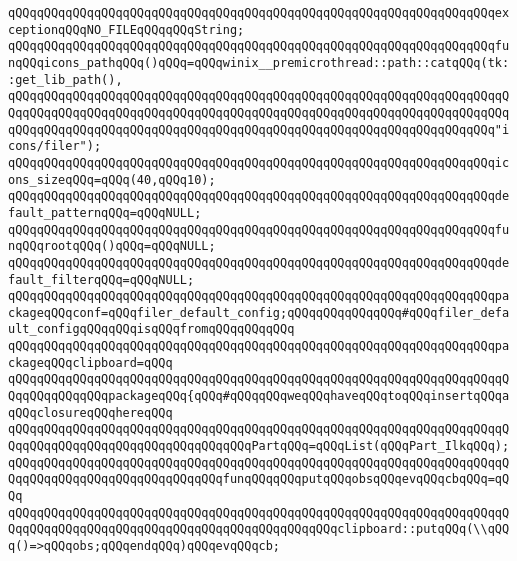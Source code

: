 \verb|qQQqqQQqqQQqqQQqqQQqqQQqqQQqqQQqqQQqqQQqqQQqqQQqqQQqqQQqqQQqqQQqqQQqexceptionqQQqNO_FILEqQQqqQQqString;|\newline
\verb|qQQqqQQqqQQqqQQqqQQqqQQqqQQqqQQqqQQqqQQqqQQqqQQqqQQqqQQqqQQqqQQqqQQqfunqQQqicons_pathqQQq()qQQq=qQQqwinix__premicrothread::path::catqQQq(tk::get_lib_path(),|\newline
\verb|qQQqqQQqqQQqqQQqqQQqqQQqqQQqqQQqqQQqqQQqqQQqqQQqqQQqqQQqqQQqqQQqqQQqqQQqqQQqqQQqqQQqqQQqqQQqqQQqqQQqqQQqqQQqqQQqqQQqqQQqqQQqqQQqqQQqqQQqqQQqqQQqqQQqqQQqqQQqqQQqqQQqqQQqqQQqqQQqqQQqqQQqqQQqqQQqqQQqqQQqqQQqqQQq"icons/filer");|\newline
\verb|qQQqqQQqqQQqqQQqqQQqqQQqqQQqqQQqqQQqqQQqqQQqqQQqqQQqqQQqqQQqqQQqqQQqicons_sizeqQQq=qQQq(40,qQQq10);|\newline
\verb|qQQqqQQqqQQqqQQqqQQqqQQqqQQqqQQqqQQqqQQqqQQqqQQqqQQqqQQqqQQqqQQqqQQqdefault_patternqQQq=qQQqNULL;|\newline
\verb|qQQqqQQqqQQqqQQqqQQqqQQqqQQqqQQqqQQqqQQqqQQqqQQqqQQqqQQqqQQqqQQqqQQqfunqQQqrootqQQq()qQQq=qQQqNULL;|\newline
\verb|qQQqqQQqqQQqqQQqqQQqqQQqqQQqqQQqqQQqqQQqqQQqqQQqqQQqqQQqqQQqqQQqqQQqdefault_filterqQQq=qQQqNULL;|\newline
\newline
\verb|qQQqqQQqqQQqqQQqqQQqqQQqqQQqqQQqqQQqqQQqqQQqqQQqqQQqqQQqqQQqqQQqqQQqpackageqQQqconf=qQQqfiler_default_config;qQQqqQQqqQQqqQQq#qQQqfiler_default_configqQQqqQQqisqQQqfromqQQqqQQqqQQq|\newline
\newline
\verb|qQQqqQQqqQQqqQQqqQQqqQQqqQQqqQQqqQQqqQQqqQQqqQQqqQQqqQQqqQQqqQQqqQQqpackageqQQqclipboard=qQQq|\newline
\verb|qQQqqQQqqQQqqQQqqQQqqQQqqQQqqQQqqQQqqQQqqQQqqQQqqQQqqQQqqQQqqQQqqQQqqQQqqQQqqQQqqQQqpackageqQQq{qQQq#qQQqqQQqweqQQqhaveqQQqtoqQQqinsertqQQqaqQQqclosureqQQqhereqQQq|\newline
\verb|qQQqqQQqqQQqqQQqqQQqqQQqqQQqqQQqqQQqqQQqqQQqqQQqqQQqqQQqqQQqqQQqqQQqqQQqqQQqqQQqqQQqqQQqqQQqqQQqqQQqqQQqPartqQQq=qQQqList(qQQqPart_IlkqQQq);|\newline
\verb|qQQqqQQqqQQqqQQqqQQqqQQqqQQqqQQqqQQqqQQqqQQqqQQqqQQqqQQqqQQqqQQqqQQqqQQqqQQqqQQqqQQqqQQqqQQqqQQqqQQqfunqQQqqQQqputqQQqobsqQQqevqQQqcbqQQq=qQQq|\newline
\verb|qQQqqQQqqQQqqQQqqQQqqQQqqQQqqQQqqQQqqQQqqQQqqQQqqQQqqQQqqQQqqQQqqQQqqQQqqQQqqQQqqQQqqQQqqQQqqQQqqQQqqQQqqQQqqQQqqQQqclipboard::putqQQq(\\qQQq()=>qQQqobs;qQQqendqQQq)qQQqevqQQqcb;|\newline
